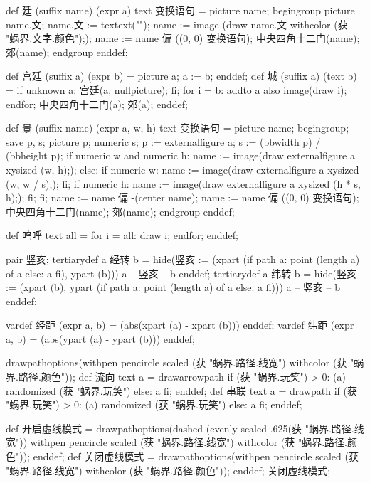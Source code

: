 \startMPinclusions[+]
def 廷 (suffix name) (expr a) text 变换语句 =
  picture name;
  begingroup
    picture name.文; name.文 := textext("");
    name := image (draw name.文 withcolor (获 "蜗界.文字.颜色"););
    name := name 偏 ((0, 0) 变换语句); 
    中央四角十二门(name); 郊(name);
  endgroup
enddef;
\stopMPinclusions

\startMPinclusions[+]
def 宫廷 (suffix a) (expr b) = picture a; a := b; enddef;
def 城 (suffix a) (text b) =
  if unknown a:
    宫廷(a, nullpicture);
  fi;
  for i = b: addto a also image(draw i); endfor;
  中央四角十二门(a); 郊(a);
enddef;
\stopMPinclusions

\startMPinclusions[+]
def 景 (suffix name) (expr a, w, h) text 变换语句 =
  picture name;
  begingroup;
  save p, s; picture p; numeric s;
  p := externalfigure a;
  s := (bbwidth p) / (bbheight p);
  if numeric w and numeric h:
    name := image(draw externalfigure a xysized (w, h););
  else:
    if numeric w:
      name := image(draw externalfigure a xysized (w, w / s););
    fi;
    if numeric h:
       name := image(draw externalfigure a xysized (h * s, h););
    fi;
  fi;
  name := name 偏 -(center name); %
  name := name 偏 ((0, 0) 变换语句); 
  中央四角十二门(name); 郊(name);
  endgroup
enddef;

def 呜呼 text all =
  for i = all: draw i; endfor;
enddef;
\stopMPinclusions

\startMPinclusions[+]
pair 竖亥;
tertiarydef a 经转 b =
  hide(竖亥 := (xpart (if path a: point (length a) of a else: a fi), ypart (b)))
  a -- 竖亥 -- b
enddef;
tertiarydef a 纬转 b =
  hide(竖亥 := (xpart (b), ypart (if path a: point (length a) of a else: a fi)))
  a --  竖亥 -- b
enddef;
\stopMPinclusions

\startMPinclusions[+]
vardef 经距 (expr a, b) = (abs(xpart (a) - xpart (b))) enddef;
vardef 纬距 (expr a, b) = (abs(ypart (a) - ypart (b))) enddef;
\stopMPinclusions

\startMPinclusions[+]
drawpathoptions(withpen pencircle scaled (获 "蜗界.路径.线宽") withcolor (获 "蜗界.路径.颜色"));
def 流向 text a =
  drawarrowpath if (获 "蜗界.玩笑") > 0: (a) randomized (获 "蜗界.玩笑") else: a fi;
enddef;
def 串联 text a =
  drawpath if (获 "蜗界.玩笑") > 0: (a) randomized (获 "蜗界.玩笑") else: a fi;  
enddef;
\stopMPinclusions

\startMPinclusions[+]
def 开启虚线模式 =
  drawpathoptions(dashed (evenly scaled .625(获 "蜗界.路径.线宽"))
                  withpen pencircle scaled (获 "蜗界.路径.线宽")
                  withcolor (获 "蜗界.路径.颜色"));
enddef;
def 关闭虚线模式 =
  drawpathoptions(withpen pencircle scaled (获 "蜗界.路径.线宽")
                  withcolor (获 "蜗界.路径.颜色"));
enddef;
关闭虚线模式;
\stopMPinclusions

